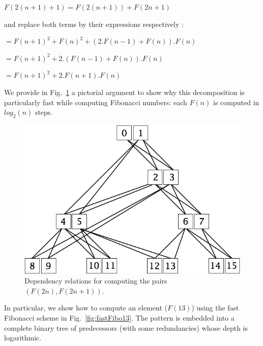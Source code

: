 $F(2(n+1)+1) = F(2(n+1)) + F(2n+1)$

and replace both terms by their expressions respectively :

$= F(n+1)^2 + F(n)^2 + (2.F(n-1) + F(n)).F(n)$

$= F(n+1)^2 + 2.(F(n-1) + F(n)).F(n)$

$= F(n+1)^2 + 2.F(n+1).F(n)$
\medskip

We provide in Fig.~\ref{fig:fastFibo} a pictorial argument to show why this decomposition 
is particularly fast while computing Fibonacci numbers:
each $F(n)$ is computed in $log_2 (n)$ steps.
\begin{figure}[h]
\begin{center}
        \includegraphics[scale=0.4]{FiguresMaths/FiboFast.png}
        \caption{Dependency relations for computing the pairs $(F(2n),F(2n+1))$.}
                \label{fig:fastFibo}
\end{center}
\end{figure}
In particular, we show how to compute an element ($F(13)$) using the fast Fibonacci scheme in Fig.~\ref{fig:fastFibo13}.
The pattern is embedded into a complete binary tree of predecessors (with some redundancies)
whose depth is logarithmic.
